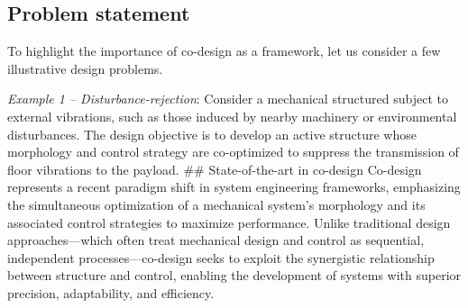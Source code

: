 \hypertarget{problem-statement}{%
\subsection{Problem statement}\label{problem-statement}}

To highlight the importance of co-design as a framework, let us consider
a few illustrative design problems.

\emph{Example 1 -- Disturbance-rejection}: Consider a mechanical
structured subject to external vibrations, such as those induced by
nearby machinery or environmental disturbances. The design objective is
to develop an active structure whose morphology and control strategy are
co-optimized to suppress the transmission of floor vibrations to the
payload. \#\# State-of-the-art in co-design Co-design represents a
recent paradigm shift in system engineering frameworks, emphasizing the
simultaneous optimization of a mechanical system's morphology and its
associated control strategies to maximize performance. Unlike
traditional design approaches---which often treat mechanical design and
control as sequential, independent processes---co-design seeks to
exploit the synergistic relationship between structure and control,
enabling the development of systems with superior precision,
adaptability, and efficiency.

\lipsum[2-3]

